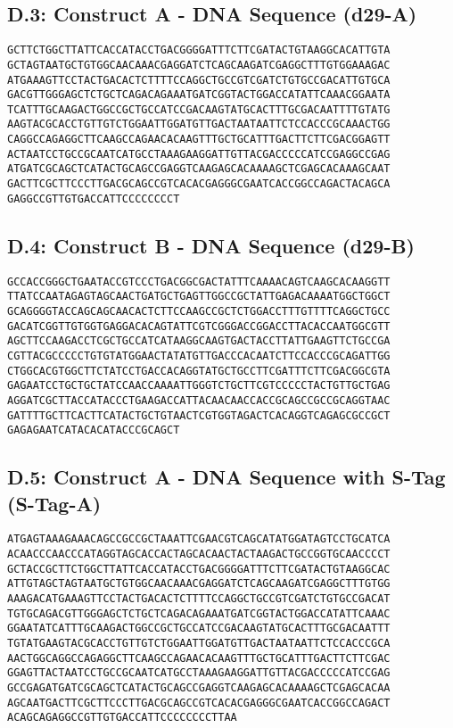 \subsection*{D.3: Construct A - DNA Sequence (d29-A)}
\begin{verbatim}
GCTTCTGGCTTATTCACCATACCTGACGGGGATTTCTTCGATACTGTAAGGCACATTGTA
GCTAGTAATGCTGTGGCAACAAACGAGGATCTCAGCAAGATCGAGGCTTTGTGGAAAGAC
ATGAAAGTTCCTACTGACACTCTTTTCCAGGCTGCCGTCGATCTGTGCCGACATTGTGCA
GACGTTGGGAGCTCTGCTCAGACAGAAATGATCGGTACTGGACCATATTCAAACGGAATA
TCATTTGCAAGACTGGCCGCTGCCATCCGACAAGTATGCACTTTGCGACAATTTTGTATG
AAGTACGCACCTGTTGTCTGGAATTGGATGTTGACTAATAATTCTCCACCCGCAAACTGG
CAGGCCAGAGGCTTCAAGCCAGAACACAAGTTTGCTGCATTTGACTTCTTCGACGGAGTT
ACTAATCCTGCCGCAATCATGCCTAAAGAAGGATTGTTACGACCCCCATCCGAGGCCGAG
ATGATCGCAGCTCATACTGCAGCCGAGGTCAAGAGCACAAAAGCTCGAGCACAAAGCAAT
GACTTCGCTTCCCTTGACGCAGCCGTCACACGAGGGCGAATCACCGGCCAGACTACAGCA
GAGGCCGTTGTGACCATTCCCCCCCCT
\end{verbatim}
\subsection*{D.4: Construct B - DNA Sequence (d29-B)}
\begin{verbatim}
GCCACCGGGCTGAATACCGTCCCTGACGGCGACTATTTCAAAACAGTCAAGCACAAGGTT
TTATCCAATAGAGTAGCAACTGATGCTGAGTTGGCCGCTATTGAGACAAAATGGCTGGCT
GCAGGGGTACCAGCAGCAACACTCTTCCAAGCCGCTCTGGACCTTTGTTTTCAGGCTGCC
GACATCGGTTGTGGTGAGGACACAGTATTCGTCGGGACCGGACCTTACACCAATGGCGTT
AGCTTCCAAGACCTCGCTGCCATCATAAGGCAAGTGACTACCTTATTGAAGTTCTGCCGA
CGTTACGCCCCCTGTGTATGGAACTATATGTTGACCCACAATCTTCCACCCGCAGATTGG
CTGGCACGTGGCTTCTATCCTGACCACAGGTATGCTGCCTTCGATTTCTTCGACGGCGTA
GAGAATCCTGCTGCTATCCAACCAAAATTGGGTCTGCTTCGTCCCCCTACTGTTGCTGAG
AGGATCGCTTACCATACCCTGAAGACCATTACAACAACCACCGCAGCCGCCGCAGGTAAC
GATTTTGCTTCACTTCATACTGCTGTAACTCGTGGTAGACTCACAGGTCAGAGCGCCGCT
GAGAGAATCATACACATACCCGCAGCT
\end{verbatim}
\subsection*{D.5: Construct A - DNA Sequence with S-Tag (S-Tag-A)}
\begin{verbatim}
ATGAGTAAAGAAACAGCCGCCGCTAAATTCGAACGTCAGCATATGGATAGTCCTGCATCA
ACAACCCAACCCATAGGTAGCACCACTAGCACAACTACTAAGACTGCCGGTGCAACCCCT
GCTACCGCTTCTGGCTTATTCACCATACCTGACGGGGATTTCTTCGATACTGTAAGGCAC
ATTGTAGCTAGTAATGCTGTGGCAACAAACGAGGATCTCAGCAAGATCGAGGCTTTGTGG
AAAGACATGAAAGTTCCTACTGACACTCTTTTCCAGGCTGCCGTCGATCTGTGCCGACAT
TGTGCAGACGTTGGGAGCTCTGCTCAGACAGAAATGATCGGTACTGGACCATATTCAAAC
GGAATATCATTTGCAAGACTGGCCGCTGCCATCCGACAAGTATGCACTTTGCGACAATTT
TGTATGAAGTACGCACCTGTTGTCTGGAATTGGATGTTGACTAATAATTCTCCACCCGCA
AACTGGCAGGCCAGAGGCTTCAAGCCAGAACACAAGTTTGCTGCATTTGACTTCTTCGAC
GGAGTTACTAATCCTGCCGCAATCATGCCTAAAGAAGGATTGTTACGACCCCCATCCGAG
GCCGAGATGATCGCAGCTCATACTGCAGCCGAGGTCAAGAGCACAAAAGCTCGAGCACAA
AGCAATGACTTCGCTTCCCTTGACGCAGCCGTCACACGAGGGCGAATCACCGGCCAGACT
ACAGCAGAGGCCGTTGTGACCATTCCCCCCCCTTAA
\end{verbatim}
